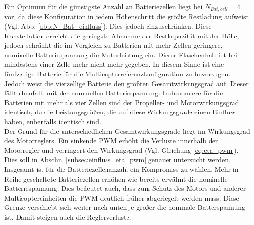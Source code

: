 Ein Optimum für die günstigste Anzahl an Batteriezellen liegt bei \ensuremath{N_{Bat,cell} = 4} vor, da diese Konfiguration in jedem Höhenschritt die größte Restladung aufweist (Vgl. Abb. \ref{abb:N_Bat_einfluss}). Dies jedoch einzuschränken. Diese Konstellation erreicht die geringste Abnahme der Restkapazität mit der Höhe, jedoch schränkt die im Vergleich zu Batterien mit mehr Zellen geringere, nominelle Batteriespannung die Motorleistung ein. Dieser Flaschenhals ist bei mindestens einer Zelle mehr nicht mehr gegeben. In diesem Sinne ist eine fünfzellige Batterie für die Multicopterreferenzkonfiguration zu bevorzugen. Jedoch weist die vierzellige Batterie den größten Gesamtwirkungsgrad auf. Dieser fällt ebenfalls mit der nominellen Batteriespannung. Insbesondere für die Batterien mit mehr als vier Zellen sind der Propeller- und Motorwirkungsgrad identisch, da die Leistungsgrößen, die auf diese Wirkungsgrade einen Einfluss haben, enbenfalls identisch sind. \\
Der Grund für die unterschiedlichen Gesamtwirkungsgrade liegt im Wirkungsgrad des Motorreglers. Ein sinkende PWM erhöht die Verluste innerhalb der Motorregler und verringert den Wirkungsgrad (Vgl. Gleichung \ref{eq:eta_pwm}). Dies soll in Abschn. \ref{subsec:einfluss_eta_pwm} genauer untersucht werden.
Insgesamt ist für die Batteriezellenanzahl ein Kompromiss zu wählen. Mehr in Reihe geschaltete Batteriezellen erhöhen wie bereits erwähnt die nominelle Batteriespannung. Dies bedeutet auch, dass zum Schutz des Motors und anderer Multicoptereinheiten die PWM deutlich früher abgeriegelt werden muss. Diese Grenze verschiebt sich weiter nach unten je größer die nominale Batterspannung ist. Damit steigen auch die Reglerverluste.


